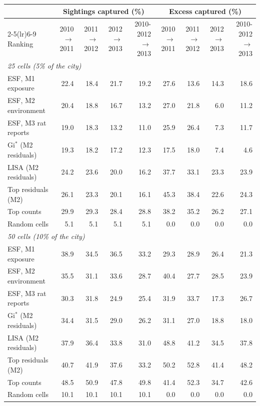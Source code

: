 \begin{tabular}{lrrrrrrrr}
\toprule
 & \multicolumn{4}{c}{Sightings captured (\%)} & \multicolumn{4}{c}{Excess captured (\%)} \\
\cmidrule(lr){2-5}\cmidrule(lr){6-9}
Ranking & 2010$\to$2011 & 2011$\to$2012 & 2012$\to$2013 & 2010-2012$\to$2013 & 2010$\to$2011 & 2011$\to$2012 & 2012$\to$2013 & 2010-2012$\to$2013 \\
\midrule
\multicolumn{9}{l}{\emph{25 cells (5\% of the city)}} \\
ESF, M1 exposure & 22.4 & 18.4 & 21.7 & 19.2 & 27.6 & 13.6 & 14.3 & 18.6 \\
ESF, M2 environment & 20.4 & 18.8 & 16.7 & 13.2 & 27.0 & 21.8 & 6.0 & 11.2 \\
ESF, M3 rat reports & 19.0 & 18.3 & 13.2 & 11.0 & 25.9 & 26.4 & 7.3 & 11.7 \\
Gi$^*$ (M2 residuals) & 19.3 & 18.2 & 17.2 & 12.3 & 17.5 & 18.0 & 7.4 & 4.6 \\
LISA (M2 residuals) & 24.2 & 23.6 & 20.0 & 16.2 & 37.7 & 33.1 & 23.3 & 23.9 \\
Top residuals (M2) & 26.1 & 23.3 & 20.1 & 16.1 & 45.3 & 38.4 & 22.6 & 24.3 \\
Top counts & 29.9 & 29.3 & 28.4 & 28.8 & 38.2 & 35.2 & 26.2 & 27.1 \\
Random cells & 5.1 & 5.1 & 5.1 & 5.1 & 0.0 & 0.0 & 0.0 & 0.0 \\
\midrule
\multicolumn{9}{l}{\emph{50 cells (10\% of the city)}} \\
ESF, M1 exposure & 38.9 & 34.5 & 36.5 & 33.2 & 29.3 & 28.9 & 26.4 & 21.3 \\
ESF, M2 environment & 35.5 & 31.1 & 33.6 & 28.7 & 40.4 & 27.7 & 28.5 & 23.9 \\
ESF, M3 rat reports & 30.3 & 31.8 & 24.9 & 25.4 & 31.9 & 33.7 & 17.3 & 26.7 \\
Gi$^*$ (M2 residuals) & 34.4 & 31.5 & 29.0 & 26.2 & 31.1 & 27.0 & 18.8 & 18.0 \\
LISA (M2 residuals) & 37.9 & 36.4 & 33.8 & 31.0 & 48.8 & 41.2 & 34.5 & 37.8 \\
Top residuals (M2) & 40.7 & 41.9 & 37.6 & 33.2 & 50.2 & 52.8 & 41.4 & 48.2 \\
Top counts & 48.5 & 50.9 & 47.8 & 49.8 & 41.4 & 52.3 & 34.7 & 42.6 \\
Random cells & 10.1 & 10.1 & 10.1 & 10.1 & 0.0 & 0.0 & 0.0 & 0.0 \\
\bottomrule
\end{tabular}
